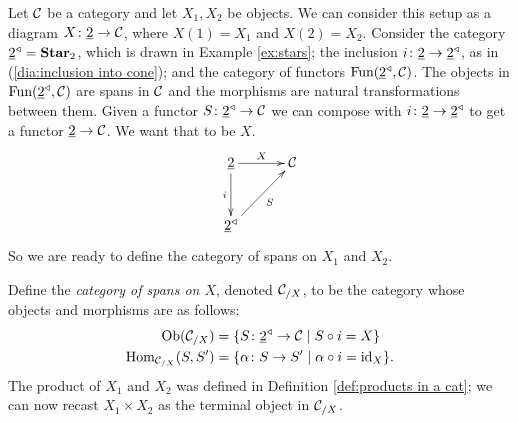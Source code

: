 \documentclass[CT4S-EN-RU]{subfiles}
\begin{document}
\begin{constructionENG}[Products]
Let $\mathcal{C}$ be a category and let $X_1,X_2$ be objects. We can consider this setup as a diagram $X\colon\underline{2}\rightarrow\mathcal{C}$, where $X(1)=X_1$ and $X(2)=X_2$. Consider the category $\underline{2}^\triangleleft={\bf Star}_2$, which is drawn in Example \ref{ex:stars}; the inclusion $i\colon\underline{2}\rightarrow\underline{2}^\triangleleft$, as in (\ref{dia:inclusion into cone}); and the category of functors $\textnormal{Fun}(\underline{2}^\triangleleft,\mathcal{C})$. The objects in $\textnormal{Fun}(\underline{2}^\triangleleft,\mathcal{C})$ are spans in $\mathcal{C}$ and the morphisms are natural transformations between them. Given a functor $S\colon\underline{2}^\triangleleft\rightarrow\mathcal{C}$ we can compose with $i\colon\underline{2}\rightarrow\underline{2}^\triangleleft$ to get a functor $\underline{2}\rightarrow\mathcal{C}$. We want that to be $X$.
$$\xymatrix@=30pt{\ul{2}\ar[r]^{X}\ar[d]_i&\mcC\\\ul{2}\lcone\ar[ur]_S}$$
So we are ready to define the category of spans on $X_1$ and $X_2$.

Define the {\em category of spans on $X$}, denoted $\mathcal{C}_{/X}$, to be the category whose objects and morphisms are as follows:
\begin{align}\label{dia:slice for products}
\textnormal{Ob}(\mathcal{C}_{/X})&=\{S\colon\underline{2}^\triangleleft\rightarrow\mathcal{C}{\;|\;}S\circ i=X\}\\
\nonumber\textnormal{Hom}_{\mathcal{C}_{/X}}(S,S')&=\{\alpha\colon S\rightarrow S'{\;|\;}\alpha\circ i=\textnormal{id}_X\}.
\end{align}
The product of $X_1$ and $X_2$ was defined in Definition \ref{def:products in a cat}; we can now recast $X_1\times X_2$ as the terminal object in $\mathcal{C}_{/X}$.


\end{constructionENG}
\end{document}
